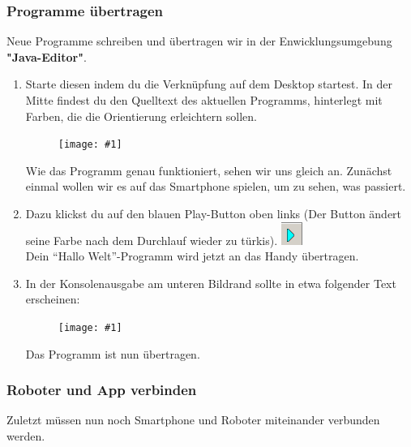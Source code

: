 \documentclass[
	12pt,
	colorbacktitle,
	accentcolor=tud1c,
	draft,
	twoside,
	german
]{tudexercise}
\newcommand{\gcenterone}[1]{
	\begin{figure}[h]
	\centering 
	\texttt{[image: \#1]}
	\end{figure}
}
\begin{document}
	\newpage
	
	
	\subsubsection{Programme übertragen}
	Neue Programme schreiben und übertragen wir in der	Enwicklungsumgebung \textbf{"Java-Editor"}.
	
	\begin{enumerate}
	\item Starte diesen indem du die Verknüpfung auf dem Desktop startest. In der Mitte findest du den Quelltext des aktuellen Programms, hinterlegt mit Farben, die die Orientierung erleichtern sollen.
	
	\gcenterone{img/je_main.png}
	
	Wie das Programm genau funktioniert, sehen wir uns gleich an. Zunächst einmal wollen wir es auf das Smartphone spielen, um zu sehen, was passiert.
	
	\item Dazu klickst du auf den blauen Play-Button oben links (Der Button ändert seine Farbe nach dem Durchlauf wieder zu türkis). 
	\includegraphics{img/je_playbutton.png} \\ Dein “Hallo Welt”-Programm wird jetzt an das Handy übertragen.
	
	\item In der Konsolenausgabe am unteren Bildrand sollte in etwa folgender Text erscheinen:
	\gcenterone{img/je_console.png}
	Das Programm ist nun übertragen.
	\end{enumerate}
	\newpage
	\subsubsection{Roboter und App verbinden}
	Zuletzt müssen nun noch Smartphone und Roboter miteinander verbunden werden. 
	
\end{document}
